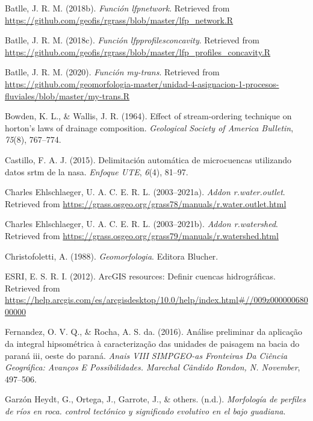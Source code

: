 \documentclass[11pt,]{article}
\begin{document}
\hypertarget{ref-lfpnetjose}{}
Batlle, J. R. M. (2018b). \emph{Función lfpnetwork}. Retrieved from
\url{https://github.com/geofis/rgrass/blob/master/lfp_network.R}

\hypertarget{ref-lfpconcajose}{}
Batlle, J. R. M. (2018c). \emph{Función lfpprofilesconcavity}. Retrieved
from
\url{https://github.com/geofis/rgrass/blob/master/lfp_profiles_concavity.R}

\hypertarget{ref-Mytransjose}{}
Batlle, J. R. M. (2020). \emph{Función my-trans}. Retrieved from
\url{https://github.com/geomorfologia-master/unidad-4-asignacion-1-procesos-fluviales/blob/master/my-trans.R}

\hypertarget{ref-bowden1964effect}{}
Bowden, K. L., \& Wallis, J. R. (1964). Effect of stream-ordering
technique on horton's laws of drainage composition. \emph{Geological
Society of America Bulletin}, \emph{75}(8), 767--774.

\hypertarget{ref-castillo2015delimitacion}{}
Castillo, F. A. J. (2015). Delimitación automática de microcuencas
utilizando datos srtm de la nasa. \emph{Enfoque UTE}, \emph{6}(4),
81--97.

\hypertarget{ref-wateroutlet}{}
Charles Ehlschlaeger, U. A. C. E. R. L. (2003--2021a). \emph{Addon
r.water.outlet}. Retrieved from
\url{https://grass.osgeo.org/grass78/manuals/r.water.outlet.html}

\hypertarget{ref-watershedcharles}{}
Charles Ehlschlaeger, U. A. C. E. R. L. (2003--2021b). \emph{Addon
r.watershed}. Retrieved from
\url{https://grass.osgeo.org/grass79/manuals/r.watershed.html}

\hypertarget{ref-christofoletti1988geomorfologia}{}
Christofoletti, A. (1988). \emph{Geomorfologia}. Editora Blucher.

\hypertarget{ref-ESRI2012}{}
ESRI, E. S. R. I. (2012). ArcGIS resources: Definir cuencas
hidrográficas. Retrieved from
\url{https://help.arcgis.com/es/arcgisdesktop/10.0/help/index.html\#//009z00000068000000}

\hypertarget{ref-fernandez2016analise}{}
Fernandez, O. V. Q., \& Rocha, A. S. da. (2016). Análise preliminar da
aplicação da integral hipsométrica à caracterização das unidades de
paisagem na bacia do paraná iii, oeste do paraná. \emph{Anais VIII
SIMPGEO-as Fronteiras Da Ciência Geográfica: Avanços E Possibilidades.
Marechal Cândido Rondon, N. November}, 497--506.

\hypertarget{ref-garzonmorfologia}{}
Garzón Heydt, G., Ortega, J., Garrote, J., \& others. (n.d.).
\emph{Morfología de perfiles de ríos en roca. control tectónico y
significado evolutivo en el bajo guadiana}.
\end{document}
